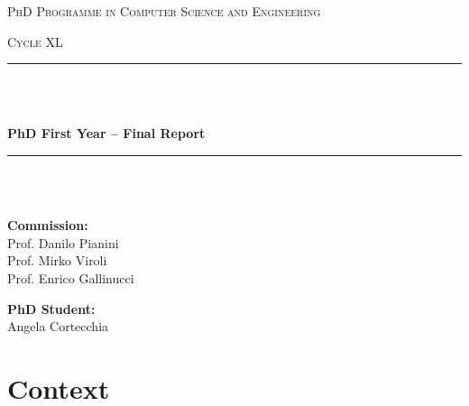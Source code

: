 \documentclass[runningheads]{llncs}
\begin{document}
    \begin{titlepage}
        \centering
        \vspace*{2cm}

        {\scshape\Large PhD Programme in Computer Science and Engineering \par}
        \vspace{0.5cm}
        {\scshape\large Cycle XL \par}
        \vspace{0.5cm}

        \rule{\linewidth}{0.4mm} \\ [0.1mm]
        \raisebox{0.2cm}{\rule{\linewidth}{0.8mm}} \\[0.8cm]
        {\huge\bfseries PhD First Year -- Final Report \par}
        \vspace{0.8cm}
        \rule{\linewidth}{0.8mm} \\ [0.1pt]
        \raisebox{0.2cm}{\rule{\linewidth}{0.4mm}} \\[1.5cm]


        \vspace{1.5cm}

        \noindent
        \begin{minipage}[t]{0.45\textwidth}
            \raggedright
            \textbf{Commission:}\\[0.5cm]
            Prof. Danilo Pianini\\
            Prof. Mirko Viroli\\
            Prof. Enrico Gallinucci
        \end{minipage}%
        \hfill
        \begin{minipage}[t]{0.45\textwidth}
            \raggedleft
            \textbf{PhD Student:}\\[0.5cm]
            Angela Cortecchia
        \end{minipage}

        \vfill

    \end{titlepage}

    \section{Context}\label{sec:context}
\end{document}
